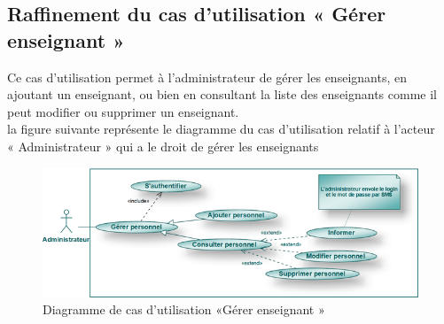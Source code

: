 \documentclass[12 pt]{report}
\begin{document}
\subsection{Raffinement du cas d’utilisation « Gérer enseignant »}
Ce cas d'utilisation permet à l'administrateur de gérer les enseignants, en ajoutant un enseignant, ou bien en consultant la liste des enseignants comme il peut modifier ou supprimer un enseignant.\\
la figure suivante représente le diagramme du cas d’utilisation  relatif à l’acteur \\« Administrateur » qui a le droit de gérer les enseignants 

 \begin{figure}[h]
 \begin{center}
 \includegraphics[width= 13 cm ,height= 6 cm]{admin1.png}
\caption{ Diagramme de cas d'utilisation  «Gérer enseignant »}
 \end{center}
\end{figure}
\end{document}
